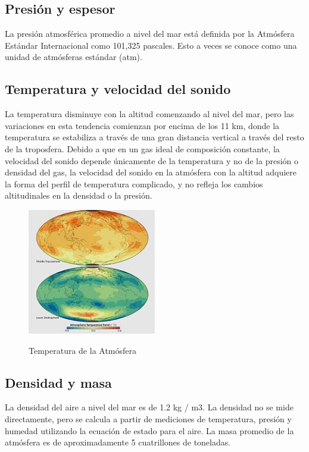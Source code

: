 \documentclass{article}
\begin{document}
\subsection{Presión y espesor}
La presión atmosférica promedio a nivel del mar está definida por la Atmósfera Estándar Internacional como 101,325 pascales. Esto a veces se conoce como una unidad de atmósferas estándar (atm).

\subsection{Temperatura y velocidad del sonido}

 La temperatura disminuye con la altitud comenzando al nivel del mar, pero las variaciones en esta tendencia comienzan por encima de los 11 km, donde la temperatura se estabiliza a través de una gran distancia vertical a través del resto de la troposfera.
 Debido a que en un gas ideal de composición constante, la velocidad del sonido depende únicamente de la temperatura y no de la presión o densidad del gas, la velocidad del sonido en la atmósfera con la altitud adquiere la forma del perfil de temperatura complicado, y no refleja los cambios altitudinales en la densidad o la presión.
 
 \begin{figure}
   \caption{Temperatura de la Atmósfera}
   \includegraphics[width=0.5\textwidth]{Atmospheric_Temperature_Trend.jpg}%
   \centering
   \label{Atmósfera de la Tierra}%
  \end{figure}

\subsection{Densidad y masa}

La densidad del aire a nivel del mar es de 1.2 kg / m3. La densidad no se mide directamente, pero se calcula a partir de mediciones de temperatura, presión y humedad utilizando la ecuación de estado para el aire. La masa promedio de la atmósfera es de aproximadamente 5 cuatrillones de toneladas.
\end{document}
